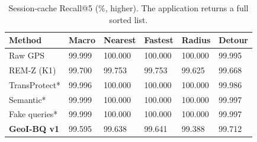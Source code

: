 \begin{table}[t]\centering\footnotesize
\caption{Session-cache Recall@5 (\%, higher). The application returns a full sorted list.}\label{tab:utility}
\begin{tabularx}{\linewidth}{@{}P{2.7cm}YYYYY@{}}\toprule
\textbf{Method} & \textbf{Macro} & \textbf{Nearest} & \textbf{Fastest} & \textbf{Radius} & \textbf{Detour} \\
\midrule
Raw GPS & 99.999 & 100.000 & 100.000 & 100.000 & 99.995 \\
REM-Z (K1) & 99.700 & 99.753 & 99.753 & 99.625 & 99.668 \\
TransProtect* & 99.996 & 100.000 & 100.000 & 100.000 & 99.986 \\
Semantic* & 99.999 & 100.000 & 100.000 & 100.000 & 99.997 \\
Fake queries* & 99.999 & 100.000 & 100.000 & 100.000 & 99.997 \\
\textbf{GeoI-BQ v1} & 99.595 & 99.638 & 99.641 & 99.388 & 99.712 \\
\bottomrule\end{tabularx}
\end{table}
